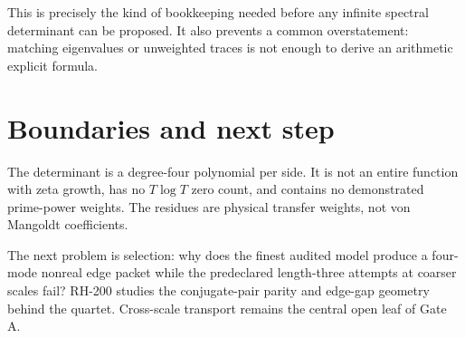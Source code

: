 \documentclass[12pt]{article}
\theoremstyle{remark}
\begin{document}
This is precisely the kind of bookkeeping needed before any infinite
spectral determinant can be proposed.  It also prevents a common
overstatement: matching eigenvalues or unweighted traces is not enough to
derive an arithmetic explicit formula.

\section{Boundaries and next step}

The determinant is a degree-four polynomial per side.  It is not an entire
function with zeta growth, has no $T\log T$ zero count, and contains no
demonstrated prime-power weights.  The residues are physical transfer
weights, not von Mangoldt coefficients.

The next problem is selection: why does the finest audited model produce a
four-mode nonreal edge packet while the predeclared length-three attempts at
coarser scales fail?  RH-200 studies the conjugate-pair parity and edge-gap
geometry behind the quartet.  Cross-scale transport remains the central
open leaf of Gate A.



\end{document}
